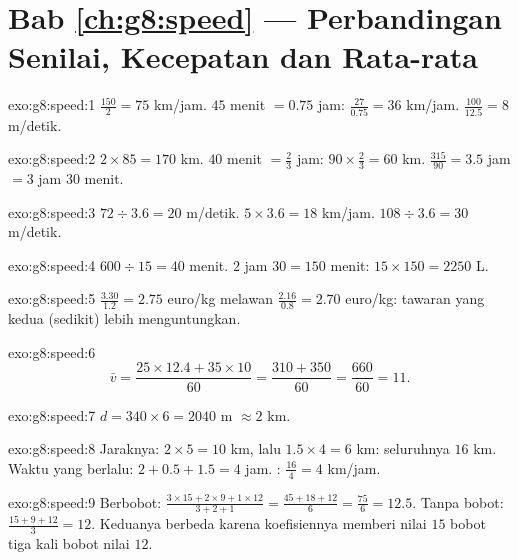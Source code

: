 \section*{Bab \ref{ch:g8:speed} --- Perbandingan Senilai, Kecepatan dan Rata-rata}

\begin{solution}{exo:g8:speed:1}
$\frac{150}{2} = 75$ km/jam. \quad
$45$ menit $= 0.75$ jam: $\frac{27}{0.75} = 36$ km/jam. \quad
$\frac{100}{12.5} = 8$ m/detik.
\end{solution}

\begin{solution}{exo:g8:speed:2}
$2 \times 85 = 170$ km. \quad
$40$ menit $= \frac23$ jam: $90 \times \frac23 = 60$ km. \quad
$\frac{315}{90} = 3.5$ jam $= 3$ jam $30$ menit.
\end{solution}

\begin{solution}{exo:g8:speed:3}
$72 \div 3.6 = 20$ m/detik. \quad
$5 \times 3.6 = 18$ km/jam. \quad
$108 \div 3.6 = 30$ m/detik.
\end{solution}

\begin{solution}{exo:g8:speed:4}
$600 \div 15 = 40$ menit. \quad
$2$ jam $30 = 150$ menit: $15 \times 150 = 2250$ L.
\end{solution}

\begin{solution}{exo:g8:speed:5}
$\frac{3.30}{1.2} = 2.75$ euro/kg melawan
$\frac{2.16}{0.8} = 2.70$ euro/kg: tawaran yang kedua (sedikit) lebih
menguntungkan.
\end{solution}

\begin{solution}{exo:g8:speed:6}
\[
\bar v = \frac{25 \times 12.4 + 35 \times 10}{60}
= \frac{310 + 350}{60} = \frac{660}{60} = 11 .
\]
\end{solution}

\begin{solution}{exo:g8:speed:7}
$d = 340 \times 6 = 2040$ m $\approx 2$ km.
\end{solution}

\begin{solution}{exo:g8:speed:8}
Jaraknya: $2 \times 5 = 10$ km, lalu $1.5 \times 4 = 6$ km:
seluruhnya $16$ km. Waktu yang berlalu: $2 + 0.5 + 1.5 = 4$ jam.
: $\frac{16}{4} = 4$ km/jam.
\end{solution}

\begin{solution}{exo:g8:speed:9}
Berbobot:
$\frac{3 \times 15 + 2 \times 9 + 1 \times 12}{3 + 2 + 1}
= \frac{45 + 18 + 12}{6} = \frac{75}{6} = 12.5$.
Tanpa bobot: $\frac{15 + 9 + 12}{3} = 12$. Keduanya berbeda karena
koefisiennya memberi nilai $15$ bobot tiga kali bobot nilai
$12$.
\end{solution}

